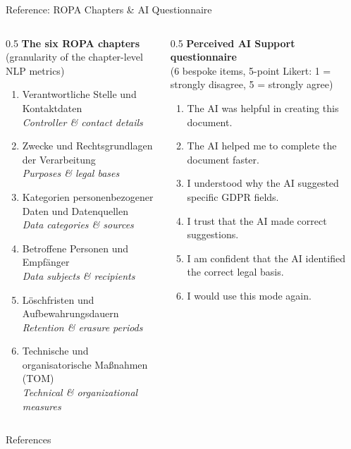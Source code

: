 \documentclass[aspectratio=1610,11pt]{beamer}
\begin{document}
\begin{frame}{Reference: ROPA Chapters \& AI Questionnaire}
\footnotesize
\begin{columns}[T]
\begin{column}{0.5\textwidth}
\textbf{The six ROPA chapters} \\[0.05cm]
{\scriptsize (granularity of the chapter-level NLP metrics)}\\[0.12cm]
\begin{enumerate}\setlength{\itemsep}{0.05cm}
  \item Verantwortliche Stelle und Kontaktdaten\\ {\scriptsize\itshape Controller \& contact details}
  \item Zwecke und Rechtsgrundlagen der Verarbeitung\\ {\scriptsize\itshape Purposes \& legal bases}
  \item Kategorien personenbezogener Daten und Datenquellen\\ {\scriptsize\itshape Data categories \& sources}
  \item Betroffene Personen und Empf\"anger\\ {\scriptsize\itshape Data subjects \& recipients}
  \item L\"oschfristen und Aufbewahrungsdauern\\ {\scriptsize\itshape Retention \& erasure periods}
  \item Technische und organisatorische Ma\ss nahmen (TOM)\\ {\scriptsize\itshape Technical \& organizational measures}
\end{enumerate}
\end{column}
\begin{column}{0.5\textwidth}
\textbf{Perceived AI Support questionnaire} \\[0.1cm]
{\scriptsize (6 bespoke items, 5-point Likert: 1 = strongly disagree, 5 = strongly agree)}\\[0.2cm]
\begin{enumerate}\setlength{\itemsep}{0.28cm}
  \item The AI was helpful in creating this document.
  \item The AI helped me to complete the document faster.
  \item I understood why the AI suggested specific GDPR fields.
  \item I trust that the AI made correct suggestions.
  \item I am confident that the AI identified the correct legal basis.
  \item I would use this mode again.
\end{enumerate}
\end{column}
\end{columns}
\end{frame}

\begin{frame}[allowframebreaks]{References}
\renewcommand*{\bibfont}{\scriptsize}
\printbibliography[heading=none]
\end{frame}
\end{document}
